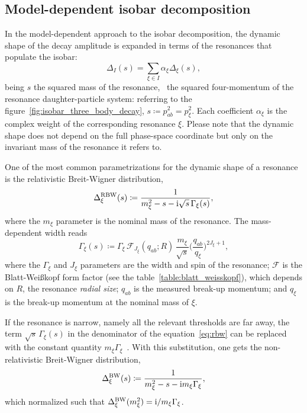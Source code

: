 \subsection{Model-dependent isobar decomposition}


    In the model-dependent approach to the isobar decomposition, the dynamic shape of the decay amplitude is expanded in terms of the resonances that populate the isobar:
    \begin{equation}\label{eq:isobar_mass_shape_expansion}
        \Delta_I(s) = \sum_{\xi\in I} \alpha_{\xi}\Delta_{\xi}(s),
    \end{equation}
    being $s$ the squared mass of the resonance, \ie~the squared four-momentum of the resonance daughter-particle system: referring to the figure~\ref{fig:isobar_three_body_decay}, $s\coloneqq p_{ab}^2 = p_{\xi}^2$.
    Each coefficient $\alpha_{\xi}$ is the complex weight of the corresponding resonance $\xi$.
    Please note that the dynamic shape does not depend on the full phase-space coordinate but only on the invariant mass of the resonance it refers to.


    One of the most common parametrizations for the dynamic shape of a resonance is the relativistic Breit-Wigner distribution,
    \begin{equation}\label{eq:rbw}
        \Delta_{\xi}^{\text{RBW}}(s) \coloneqq \frac{1}{m_{\xi}^2 - s - \mathrm{i} \sqrt{s}\, \Gamma_\xi(s)},
    \end{equation}
    where the $m_{\xi}$ parameter is the nominal mass of the resonance.
    The mass-dependent width reads
    \begin{equation}
        \Gamma_\xi(s) \coloneqq \Gamma_{\xi} \, \mathcal{F}_{\!J_\xi}\!(q_{ab};R)\, \frac{m_{\xi}}{\sqrt{s}} \bigg(\frac{q_{ab}}{q_{\xi}}\bigg)^{2J_{\xi}+1},
    \end{equation}
    where the $\Gamma_{\xi}$ and $J_{\xi}$ parameters are the width and spin of the resonance;
    $\mathcal{F}$ is the Blatt-Wei\ss{}kopf form factor (see the table~\ref{table:blatt_weisskopf}), which depends on $R$, the resonance \emph{radial size};
    $q_{ab}$ is the measured break-up momentum;
    and $q_\xi$ is the break-up momentum at the nominal mass of $\xi$.


    If the resonance is narrow, namely all the relevant thresholds are far away, the term $\sqrt{s}\,\Gamma_\xi(s)$ in the denominator of the equation~\eqref{eq:rbw} can be replaced with the constant quantity $m_{\xi}\Gamma_{\xi}$~\cite[\S~47.2.1]{chinese_phisics}.
    With this substitution, one gets the non-relativistic Breit-Wigner distribution,
    \begin{equation}\label{eq:bw}
        \Delta_{\xi}^{\text{BW}}(s) \coloneqq \frac{1}{m_{\xi}^2 - s - \mathrm{i} m_{\xi} \Gamma_{\xi}},
    \end{equation}
    which normalized such that $\Delta_{\xi}^{\text{BW}}(m_{\xi}^2) = \mathrm{i} / m_\xi\Gamma_\xi$.


